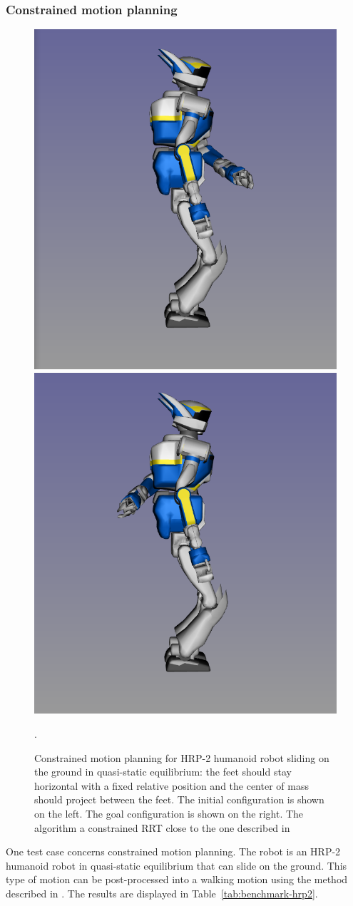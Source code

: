\subsubsection{Constrained motion planning}

\begin{figure}
  \begin{center}
    \includegraphics[width=.49\linewidth]{figures/hrp2-q-init.png}
    \includegraphics[width=.49\linewidth]{figures/hrp2-q-goal.png}
  \end{center}
  \caption{Constrained motion planning for HRP-2 humanoid robot sliding on the ground in quasi-static equilibrium: the feet should stay horizontal with a fixed relative position and the center of mass should project between the feet. The initial configuration is shown on the left. The goal configuration is shown on the right. The algorithm a constrained RRT close to the one described in~\cite{DalNakLamLau2009}}.
  \label{fig:benchmark-hrp2}
\end{figure}
One test case concerns constrained motion planning. The robot is an HRP-2 humanoid robot in quasi-static equilibrium that can slide on the ground. This type of motion can be post-processed into a walking motion using the method described in \cite{dalibard:hal-00654175}. The results are displayed in Table~\ref{tab:benchmark-hrp2}.
